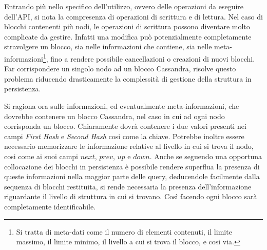 		Entrando più nello specifico dell'utilizzo, ovvero delle operazioni da eseguire dell'API, si nota la compresenza di operazioni di scrittura e di lettura. Nel caso di blocchi contenenti più nodi, le operazioni di scrittura possono diventare molto complicate da gestire. Infatti una modifica può potenzialmente completamente stravolgere un blocco, sia nelle informazioni che contiene, sia nelle meta-informazioni\footnote{Si tratta di meta-dati come il numero di elementi contenuti, il limite massimo, il limite minimo, il livello a cui si trova il blocco, e cosi via.}, fino a rendere possibile cancellazioni o creazioni di nuovi blocchi. Far corrispondere un singolo nodo ad un blocco Cassandra, risolve questo problema riducendo drasticamente la complessità di gestione della struttura in persistenza.
		
		Si ragiona ora sulle informazioni, ed eventualmente meta-informazioni, che dovrebbe contenere un blocco Cassandra, nel caso in cui ad ogni nodo corrisponda un blocco. Chiaramente dovrà contenere i due valori presenti nei campi \textit{First Hash} e \textit{Second Hash} cosi come la chiave. Potrebbe inoltre essere necessario memorizzare le informazione relative al livello in cui si trova il nodo, cosi come ai suoi campi $ next $, $ prev $, $ up $ e $ down $. Anche se seguendo una opportuna collocazione dei blocchi in persistenza è possibile rendere superflua la presenza di queste informazioni nella maggior parte delle query, deducendole facilmente dalla sequenza di blocchi restituita, si rende necessaria la presenza dell'informazione riguardante il livello di struttura in cui si trovano. Così facendo ogni blocco sarà completamente identificabile.
		
